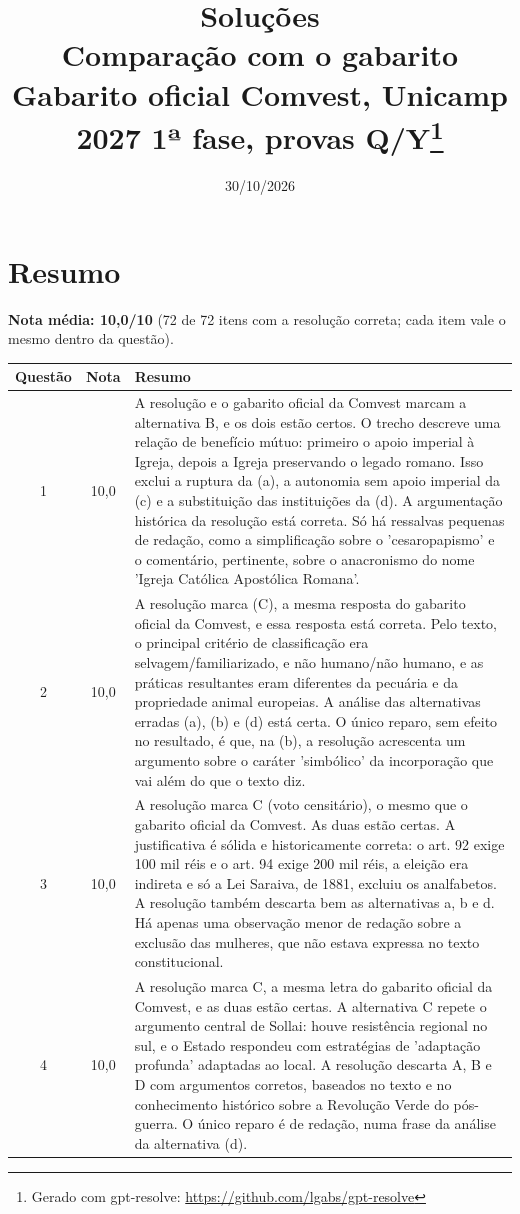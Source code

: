 \documentclass{article}%
\title{Soluções\\[4pt]\large Comparação com o gabarito Gabarito oficial Comvest, Unicamp 2027 1ª fase, provas Q/Y\thanks{Gerado com gpt-resolve: \url{https://github.com/lgabs/gpt-resolve}}}%
\date{30/10/2026}%
\begin{document}
%
\normalsize%
\maketitle%
\section*{Resumo}\textbf{Nota média: 10,0/10} (72 de 72 itens com a resolução correta; cada item vale o mesmo dentro da questão).\par\medskip%
\begin{longtable}{@{}c c p{}@{}}\toprule Questão & Nota & Resumo \\ \midrule
1 & 10,0 & A resolução e o gabarito oficial da Comvest marcam a alternativa B, e os dois estão certos. O trecho descreve uma relação de benefício mútuo: primeiro o apoio imperial à Igreja, depois a Igreja preservando o legado romano. Isso exclui a ruptura da (a), a autonomia sem apoio imperial da (c) e a substituição das instituições da (d). A argumentação histórica da resolução está correta. Só há ressalvas pequenas de redação, como a simplificação sobre o 'cesaropapismo' e o comentário, pertinente, sobre o anacronismo do nome 'Igreja Católica Apostólica Romana'. \\
2 & 10,0 & A resolução marca (C), a mesma resposta do gabarito oficial da Comvest, e essa resposta está correta. Pelo texto, o principal critério de classificação era selvagem/familiarizado, e não humano/não humano, e as práticas resultantes eram diferentes da pecuária e da propriedade animal europeias. A análise das alternativas erradas (a), (b) e (d) está certa. O único reparo, sem efeito no resultado, é que, na (b), a resolução acrescenta um argumento sobre o caráter 'simbólico' da incorporação que vai além do que o texto diz. \\
3 & 10,0 & A resolução marca C (voto censitário), o mesmo que o gabarito oficial da Comvest. As duas estão certas. A justificativa é sólida e historicamente correta: o art. 92 exige 100 mil réis e o art. 94 exige 200 mil réis, a eleição era indireta e só a Lei Saraiva, de 1881, excluiu os analfabetos. A resolução também descarta bem as alternativas a, b e d. Há apenas uma observação menor de redação sobre a exclusão das mulheres, que não estava expressa no texto constitucional. \\
4 & 10,0 & A resolução marca C, a mesma letra do gabarito oficial da Comvest, e as duas estão certas. A alternativa C repete o argumento central de Sollai: houve resistência regional no sul, e o Estado respondeu com estratégias de 'adaptação profunda' adaptadas ao local. A resolução descarta A, B e D com argumentos corretos, baseados no texto e no conhecimento histórico sobre a Revolução Verde do pós{-}guerra. O único reparo é de redação, numa frase da análise da alternativa (d). \\

\end{longtable}
\end{document}
